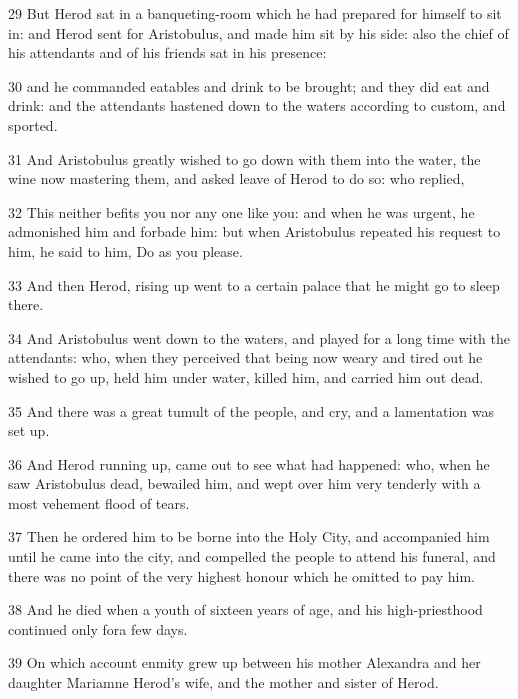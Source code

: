 \par 29 But Herod sat in a banqueting-room which he had prepared for himself to sit in: and Herod sent for Aristobulus, and made him sit by his side: also the chief of his attendants and of his friends sat in his presence: 

\par 30 and he commanded eatables and drink to be brought; and they did eat and drink: and the attendants hastened down to the waters according to custom, and sported. 

\par 31 And Aristobulus greatly wished to go down with them into the water, the wine now mastering them, and asked leave of Herod to do so: who replied, 

\par 32 This neither befits you nor any one like you: and when he was urgent, he admonished him and forbade him: but when Aristobulus repeated his request to him, he said to him, Do as you please. 

\par 33 And then Herod, rising up went to a certain palace that he might go to sleep there. 

\par 34 And Aristobulus went down to the waters, and played for a long time with the attendants: who, when they perceived that being now weary and tired out he wished to go up, held him under water, killed him, and carried him out dead. 

\par 35 And there was a great tumult of the people, and cry, and a lamentation was set up. 

\par 36 And Herod running up, came out to see what had happened: who, when he saw Aristobulus dead, bewailed him, and wept over him very tenderly with a most vehement flood of tears. 

\par 37 Then he ordered him to be borne into the Holy City, and accompanied him until he came into the city, and compelled the people to attend his funeral, and there was no point of the very highest honour which he omitted to pay him. 

\par 38 And he died when a youth of sixteen years of age, and his high-priesthood continued only fora few days. 

\par 39 On which account enmity grew up between his mother Alexandra and her daughter Mariamne Herod’s wife, and the mother and sister of Herod. 

